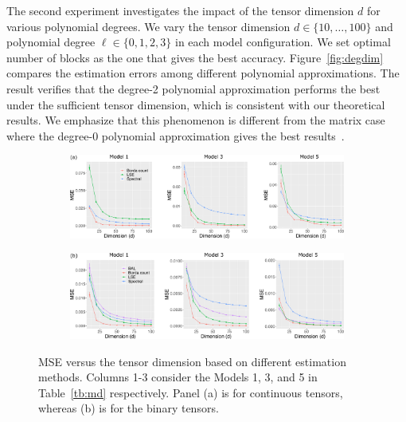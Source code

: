 \documentclass[11pt]{article}
\theoremstyle{definition}
\begin{document}
The second experiment investigates the impact of the tensor dimension $d$ for various polynomial degrees. We vary the tensor dimension $d\in\{10,\ldots,100\}$ and polynomial degree $\ell\in\{0,1,2,3\}$ in each model configuration. We set optimal number of blocks as the one that gives the best accuracy. Figure~\ref{fig:degdim} compares the estimation errors among different polynomial approximations. The result verifies that the degree-2 polynomial approximation performs the best under the sufficient tensor dimension, which is consistent with our theoretical results. We emphasize that this phenomenon is different from the matrix case where the degree-0 polynomial approximation gives the best results~\citep{gao2015rate,klopp2017oracle}.


\begin{figure}[ht!]
    \centering
    \begin{subfigure}[b]{.9\textwidth}
    \includegraphics[width = \textwidth]{figure/altdim_conti.pdf}
       \vspace{.3cm}
    \end{subfigure}
    \begin{subfigure}[b]{.9\textwidth}
    \includegraphics[width = \textwidth]{figure/altdim_binary.pdf}   
    \end{subfigure}
    \caption{MSE versus the tensor dimension based on different estimation methods. Columns 1-3 consider the Models 1, 3, and 5 in Table~\ref{tb:md} respectively. Panel (a) is for continuous tensors, whereas (b) is for the binary tensors.}
    \label{fig:method}
\end{figure}
\end{document}
